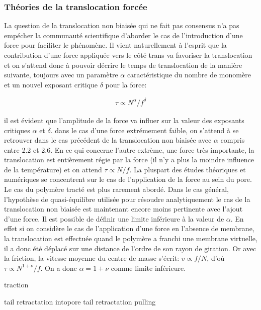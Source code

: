 \documentclass[a4paper,11pt]{article}
\begin{document}
\subsubsection{Théories de la translocation forcée}

La question de la translocation non biaisée qui ne fait pas consensus n'a pas empécher la communauté scientifique d'aborder le cas de l'introduction d'une force pour faciliter le phénomène. Il vient naturellement à l'esprit que la contribution d'une force appliquée vers le côté trans va favoriser la translocation et on s'attend donc à pouvoir décrire le temps de translocation de la manière suivante, toujours avec un paramètre $\alpha$ caractéristique du nombre de monomère et un nouvel exposant critique $\delta$ pour la force:

\begin{eqnarray}
\tau \propto N^\alpha / f^\delta
\label{taubiased}
\end{eqnarray}

il est évident que l'amplitude de la force va influer sur la valeur des exposants critiques $\alpha$ et $\delta$. dans le cas d'une force extrémement faible, on s'attend à se retrouver dans le cas précédent de la translocation non biaisée avec $\alpha$ compris entre 2.2 et 2.6. En ce qui concerne l'autre extrème, une force très importante, la translocation est entièrement régie par la force (il n'y a plus la moindre influence de la température) et on attend $\tau \propto N/f$.
 La pluspart des études théoriques et numériques se concentrent sur le cas de l'application de la force au sein du pore. Le cas du polymère tracté est plus rarement abordé.
 Dans le cas général, l'hypothèse de quasi-équilibre utilisée pour résoudre analytiquement le cas de la translocation non biaisée est maintenant encore moins pertinente avec l'ajout d'une force. Il est possible de définir une limite inférieure à la valeur de $\alpha$. En effet si on considère le cas de l'application d'une force en l'absence de membrane, la translocation est effectuée quand le polymère a franchi une membrane virtuelle, il a donc été déplacé sur une distance de l'ordre de son rayon de giration. Or avec la friction, la vitesse moyenne du centre de masse s'écrit: $v \propto f/N$, d'où $\tau \propto N^{1+\nu}/f$. On a donc $\alpha=1+\nu$ comme limite inférieure.
 
 
 

 \cite{Kantor2004} traction
 
 \cite{Ikonen2012} tail retractation intopore
  \cite{ Huopaniemi2007} tail retractation pulling
\end{document}
